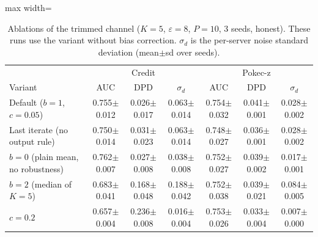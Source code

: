 \begin{table}[tbp]
\centering
\footnotesize
\setlength{\tabcolsep}{3pt}
\caption{Ablations of the trimmed channel ($K=5$, $\varepsilon=8$, $P=10$, 3 seeds, honest). These runs use the variant without bias correction. $\sigma_d$ is the per-server noise standard deviation (mean$\pm$sd over seeds).}
\label{tab:e6}
\begin{adjustbox}{max width=\textwidth}
\begin{tabular}{l ccc ccc}
\toprule
 & \multicolumn{3}{c}{Credit} & \multicolumn{3}{c}{Pokec-z} \\
Variant & AUC & DPD & $\sigma_d$ & AUC & DPD & $\sigma_d$ \\
\midrule
Default ($b=1$, $c=0.05$) & 0.755$\pm$0.012 & 0.026$\pm$0.017 & 0.063$\pm$0.014 & 0.754$\pm$0.032 & 0.041$\pm$0.001 & 0.028$\pm$0.002 \\
Last iterate (no output rule) & 0.750$\pm$0.014 & 0.031$\pm$0.023 & 0.063$\pm$0.014 & 0.748$\pm$0.027 & 0.036$\pm$0.001 & 0.028$\pm$0.002 \\
$b=0$ (plain mean, no robustness) & 0.762$\pm$0.007 & 0.027$\pm$0.008 & 0.038$\pm$0.008 & 0.752$\pm$0.027 & 0.039$\pm$0.002 & 0.017$\pm$0.001 \\
$b=2$ (median of $K=5$) & 0.683$\pm$0.041 & 0.168$\pm$0.048 & 0.188$\pm$0.042 & 0.752$\pm$0.038 & 0.039$\pm$0.021 & 0.084$\pm$0.005 \\
$c=0.2$ & 0.657$\pm$0.004 & 0.236$\pm$0.008 & 0.016$\pm$0.004 & 0.753$\pm$0.026 & 0.033$\pm$0.004 & 0.007$\pm$0.000 \\
\bottomrule
\end{tabular}
\end{adjustbox}
\end{table}
